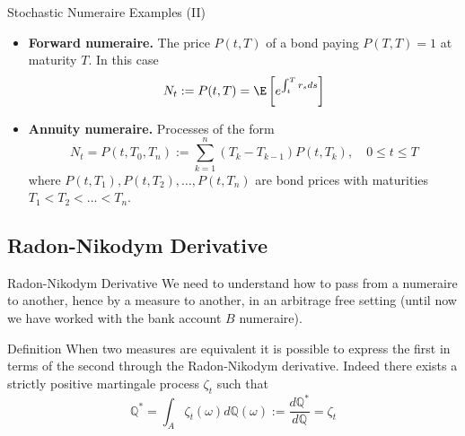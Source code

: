 \documentclass{beamer}
\begin{document}
\begin{frame}{Stochastic Numeraire Examples (II)}
	\begin{itemize}
		\item<1-> \textbf{Forward numeraire.} The price $P(t,T)$ of a bond paying $P(T,T)=1$ at maturity $T$. In this case
		\begin{equation*}
			N_t := P(t,T)=\E\left[e^{\int_t^T r_s ds}\right]
		\end{equation*}
		\item<2-> \textbf{Annuity numeraire.} Processes of the form
		\begin{equation*}
			N_t = P(t, T_0, T_n) := \sum_{k=1}^{n}(T_k - T_{k-1})P(t, T_k), \quad 0 \le t \le T
		\end{equation*}
		where $P(t,T_1),P(t,T_2),\ldots,P(t,T_n)$ are bond prices with maturities $T_1 < T_2 < \ldots < T_n$.
	\end{itemize}
\end{frame}

\subsection{Radon-Nikodym Derivative}
\begin{frame}{Radon-Nikodym Derivative}
	We need to understand how to pass from a numeraire to another, hence by a measure to another, in an arbitrage free setting (until now we have worked with the bank account $B$ numeraire).
	\begin{block}{Definition}
		When two measures are equivalent it is possible to express the first in terms of the second through the \textcolor{maincolor}{Radon-Nikodym derivative}. Indeed there exists a strictly positive \textcolor{maincolor}{martingale process $\zeta_t$} such that
		\begin{equation*}
			\mathbb{Q}^* =\int_{A} \zeta_t(\omega)d\mathbb{Q}(\omega) := \frac{d\mathbb{Q}^*}{d\mathbb{Q}} = \zeta_t
			\label{eq:radon_nikodym_der}
		\end{equation*}
	\end{block}
\end{frame}
\end{document}
